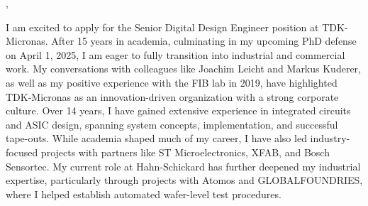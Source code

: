 



\recipient{\firma{}}{\adresse{}}
\opening{\anrede{},}
\date{\today}


\makelettertitle
\justifying



I am excited to apply for the Senior Digital Design Engineer position at TDK-Micronas. After 15 years in academia, culminating in my upcoming PhD defense on April 1, 2025, I am eager to fully transition into industrial and commercial work. My conversations with colleagues like Joachim Leicht and Markus Kuderer, as well as my positive experience with the FIB lab in 2019, have highlighted TDK-Micronas as an innovation-driven organization with a strong corporate culture. Over 14 years, I have gained extensive experience in integrated circuits and ASIC design, spanning system concepts, implementation, and successful tape-outs. While academia shaped much of my career, I have also led industry-focused projects with partners like ST Microelectronics, XFAB, and Bosch Sensortec. My current role at Hahn-Schickard has further deepened my industrial expertise, particularly through projects with Atomos and GLOBALFOUNDRIES, where I helped establish automated wafer-level test procedures.


